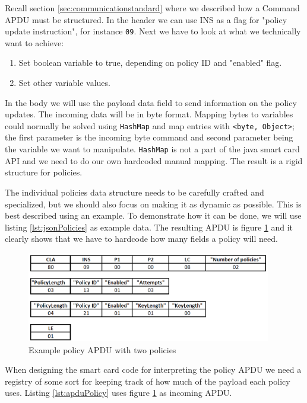 Recall section \ref{sec:communicationstandard} where we described how a Command APDU must be structured. In the header we can use INS as a flag for "policy update instruction", for instance \texttt{09}. Next we have to look at what we technically want to achieve:
\begin{enumerate}
    \item Set boolean variable to true, depending on policy ID and "enabled" flag.
    \item Set other variable values.
\end{enumerate}
In the body we will use the payload data field to send information on the policy updates. The incoming data will be in byte format. Mapping bytes to variables could normally be solved using \texttt{HashMap} and map entries with \texttt{<byte, Object>}; the first parameter is the incoming byte command and second parameter being the variable we want to manipulate. \texttt{HashMap} is not a part of the java smart card API and we need to do our own hardcoded manual mapping. The result is a rigid structure for policies.

The individual policies data structure needs to be carefully crafted and specialized, but we should also focus on making it as dynamic as possible. This is best described using an example. To demonstrate how it can be done, we will use listing \ref{lst:jsonPolicies} as example data. The resulting APDU is figure \ref{fig:policyAPDU} and it clearly shows that we have to hardcode how many fields a policy will need.

\begin{figure}[h!]
  \caption{Example policy APDU with two policies}
  \label{fig:policyAPDU}
  \centering
    \includegraphics[width=0.95\textwidth]{images/policyAPDU.png}
\end{figure}

When designing the smart card code for interpreting the policy APDU we need a registry of some sort for keeping track of how much of the payload each policy uses. Listing \ref{lst:apduPolicy} uses figure \ref{fig:policyAPDU} as incoming APDU.

